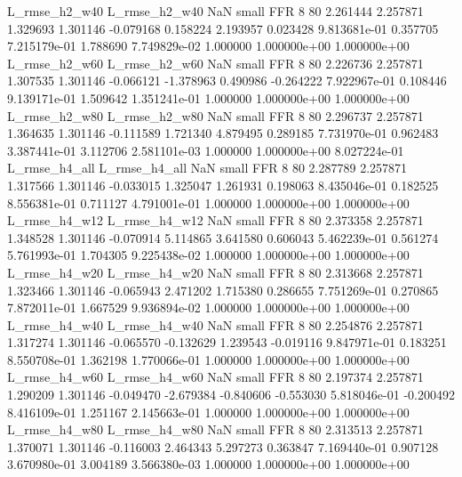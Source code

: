  L_rmse_h2_w40  L_rmse_h2_w40                   NaN      small      FFR                 8 80 2.261444       2.257871 1.329693       1.301146   -0.079168      0.158224      2.193957     0.023428   9.813681e-01  0.357705 7.215179e-01     1.788690   7.749829e-02            1.000000    1.000000e+00        1.000000e+00
 L_rmse_h2_w60  L_rmse_h2_w60                   NaN      small      FFR                 8 80 2.226736       2.257871 1.307535       1.301146   -0.066121     -1.378963      0.490986    -0.264222   7.922967e-01  0.108446 9.139171e-01     1.509642   1.351241e-01            1.000000    1.000000e+00        1.000000e+00
 L_rmse_h2_w80  L_rmse_h2_w80                   NaN      small      FFR                 8 80 2.296737       2.257871 1.364635       1.301146   -0.111589      1.721340      4.879495     0.289185   7.731970e-01  0.962483 3.387441e-01     3.112706   2.581101e-03            1.000000    1.000000e+00        8.027224e-01
 L_rmse_h4_all  L_rmse_h4_all                   NaN      small      FFR                 8 80 2.287789       2.257871 1.317566       1.301146   -0.033015      1.325047      1.261931     0.198063   8.435046e-01  0.182525 8.556381e-01     0.711127   4.791001e-01            1.000000    1.000000e+00        1.000000e+00
 L_rmse_h4_w12  L_rmse_h4_w12                   NaN      small      FFR                 8 80 2.373358       2.257871 1.348528       1.301146   -0.070914      5.114865      3.641580     0.606043   5.462239e-01  0.561274 5.761993e-01     1.704305   9.225438e-02            1.000000    1.000000e+00        1.000000e+00
 L_rmse_h4_w20  L_rmse_h4_w20                   NaN      small      FFR                 8 80 2.313668       2.257871 1.323466       1.301146   -0.065943      2.471202      1.715380     0.286655   7.751269e-01  0.270865 7.872011e-01     1.667529   9.936894e-02            1.000000    1.000000e+00        1.000000e+00
 L_rmse_h4_w40  L_rmse_h4_w40                   NaN      small      FFR                 8 80 2.254876       2.257871 1.317274       1.301146   -0.065570     -0.132629      1.239543    -0.019116   9.847971e-01  0.183251 8.550708e-01     1.362198   1.770066e-01            1.000000    1.000000e+00        1.000000e+00
 L_rmse_h4_w60  L_rmse_h4_w60                   NaN      small      FFR                 8 80 2.197374       2.257871 1.290209       1.301146   -0.049470     -2.679384     -0.840606    -0.553030   5.818046e-01 -0.200492 8.416109e-01     1.251167   2.145663e-01            1.000000    1.000000e+00        1.000000e+00
 L_rmse_h4_w80  L_rmse_h4_w80                   NaN      small      FFR                 8 80 2.313513       2.257871 1.370071       1.301146   -0.116003      2.464343      5.297273     0.363847   7.169440e-01  0.907128 3.670980e-01     3.004189   3.566380e-03            1.000000    1.000000e+00        1.000000e+00

